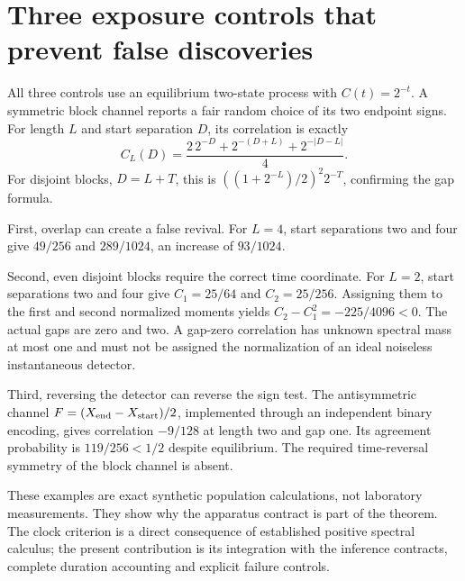 \section{Three exposure controls that prevent false discoveries}
All three controls use an equilibrium two-state process with $C(t)=2^{-t}$.
A symmetric block channel reports a fair random choice of its two endpoint
signs. For length $L$ and start separation $D$, its correlation is exactly
\[
 C_{L}(D)=\frac{2\,2^{-D}+2^{-(D+L)}+2^{-|D-L|}}4.
\]
For disjoint blocks, $D=L+T$, this is
$((1+2^{-L})/2)^2 2^{-T}$, confirming the gap formula.

First, overlap can create a false revival. For $L=4$, start separations two
and four give $49/256$ and $289/1024$, an increase of $93/1024$.

Second, even disjoint blocks require the correct time coordinate. For $L=2$,
start separations two and four give $C_1=25/64$ and $C_2=25/256$. Assigning them
to the first and second normalized moments yields
$C_2-C_1^2=-225/4096<0$. The actual gaps are zero and two. A gap-zero correlation
has unknown spectral mass at most one and must not be assigned the normalization
of an ideal noiseless instantaneous detector.

Third, reversing the detector can reverse the sign test. The antisymmetric
channel $F=(X_{\rm end}-X_{\rm start})/2$, implemented through an independent
binary encoding, gives correlation $-9/128$ at length two and gap one.
Its agreement probability is $119/256<1/2$ despite equilibrium. The required
time-reversal symmetry of the block channel is absent.

These examples are exact synthetic population calculations, not laboratory
measurements. They show why the apparatus contract is part of the theorem.
The clock criterion is a direct consequence of established positive spectral
calculus; the present contribution is its integration with the inference
contracts, complete duration accounting and explicit failure controls.
